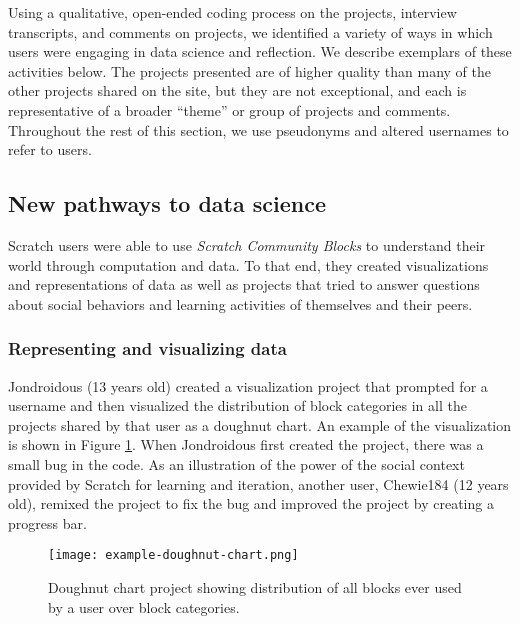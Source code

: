 \documentclass{sigchi}
\begin{document}
Using a qualitative, open-ended coding process on the projects, interview transcripts, and comments on projects, we identified a variety of ways in which users were engaging in data science and reflection. We describe exemplars of these activities below. The projects presented are of higher quality than many of the other projects shared on the site, but they are not exceptional, and each is representative of a broader ``theme'' or group of projects and comments. Throughout the rest of this section, we use pseudonyms and altered usernames to refer to users.

\subsection{New pathways to data science}

Scratch users were able to use \emph{Scratch Community Blocks} to understand their world through computation and data. To that end, they created visualizations and representations of data as well as projects that tried to answer questions about social behaviors and learning activities of themselves and their peers.

\subsubsection{Representing and visualizing data}

Jondroidous (13 years old) created a visualization project that prompted for a username and then visualized the distribution of block categories in all the projects shared by that user as a doughnut chart. An example of the visualization is shown in Figure \ref{fig:example-1}. When Jondroidous first created the project, there was a small bug in the code. As an illustration of the power of the social context provided by Scratch for learning and iteration, another user, Chewie184 (12 years old), remixed the project to fix the bug and improved the project by creating a progress bar.

\begin{figure}[h!]
\texttt{[image: example-doughnut-chart.png]}
\centering
\caption{Doughnut chart project showing distribution of all blocks ever used by a user over block categories.}
\label{fig:example-1}
\end{figure}
\end{document}
